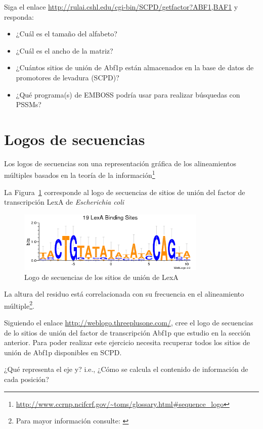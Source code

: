 \documentclass[letter,11pt]{book}
\begin{document}
{\color{red}
Siga el enlace \url{http://rulai.cshl.edu/cgi-bin/SCPD/getfactor?ABF1,BAF1} y responda:
\begin{itemize}
\item ¿Cuál es el tamaño del alfabeto?
\item ¿Cuál es el ancho de la matriz?
\item ¿Cuántos sitios de unión de Abf1p están almacenados en la base de datos de promotores de levadura (SCPD)?
\item ¿Qué programa(s) de EMBOSS podría usar para realizar búsquedas con PSSMs?
\end{itemize}
}

\section{Logos de secuencias}

Los logos de secuencias son una representación gráfica de los alineamientos múltiples basados en la teoría de la información\footnote{\url{http://www.ccrnp.ncifcrf.gov/~toms/glossary.html\#sequence_logo}}

La Figura~\ref{fig:lexALogo} corresponde al logo de secuencias de sitios de unión del factor de transcripción LexA de \textit{Escherichia coli}

\begin{figure}[h!]
\centering
 \includegraphics[width=9cm]{Figs/lexA.png}
 \caption{\label{fig:lexALogo}Logo de secuencias de los sitios de unión de LexA}
\end{figure}

La altura del residuo está correlacionada con su frecuencia en el alineamiento múltiple\footnote{Para mayor información consulte: \citealp{Schneider1990}}.

{\color{red}
Siguiendo el enlace \url{http://weblogo.threeplusone.com/}, cree el logo de secuencias de lo sitios de unión del factor de transcripción Abf1p que estudio en la sección anterior. Para poder realizar este ejercicio necesita recuperar todos los sitios de unión de Abf1p disponibles en SCPD.

¿Qué representa el eje y? i.e., ¿Cómo se calcula el contenido de información de cada posición?
}
\end{document}
